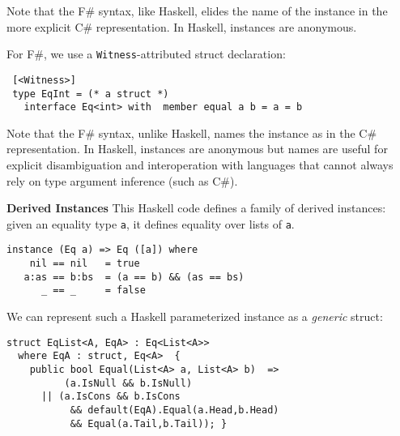 \documentclass[9pt]{sig-alternate-05-2015}
\begin{document}
Note that the F\# syntax, like Haskell, elides the name of the instance in the more explicit C\# representation.
In Haskell, instances are anonymous.

\else
For F\#, we use a \lstinline{Witness}-attributed struct declaration:

\begin{lstlisting}
 [<Witness>] 
 type EqInt = (* a struct *)
   interface Eq<int> with  member equal a b = a = b
\end{lstlisting}

Note that the F\# syntax, unlike Haskell, names the instance as in the  C\# representation.
In Haskell, instances are anonymous but names are useful for explicit disambiguation and interoperation with languages that cannot always rely on type argument inference (such as C\#).
\fi


{\bf Derived Instances}
This Haskell code defines a family of derived instances: given an equality  type \lstinline{a}, it defines equality over lists of \lstinline{a}.
{\small
\begin{lstlisting}
instance (Eq a) => Eq ([a]) where 
    nil == nil   = true
   a:as == b:bs  = (a == b) && (as == bs)
      _ == _     = false
\end{lstlisting}
}

We can represent such a Haskell parameterized instance as a \emph{generic} struct:


\begin{lstlisting}
struct EqList<A, EqA> : Eq<List<A>>
  where EqA : struct, Eq<A>  {
    public bool Equal(List<A> a, List<A> b)  =>
          (a.IsNull && b.IsNull)
      || (a.IsCons && b.IsCons 
           && default(EqA).Equal(a.Head,b.Head) 
           && Equal(a.Tail,b.Tail)); }
\end{lstlisting}
\end{document}
